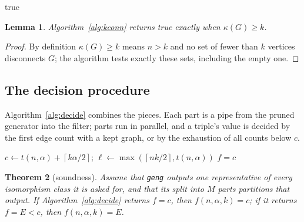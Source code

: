 \documentclass[11pt]{article}
\newtheorem{theorem}{Theorem}
\newtheorem{lemma}[theorem]{Lemma}
\theoremstyle{definition}
\theoremstyle{remark}
\newcommand{\ceil}[1]{\left\lceil #1\right\rceil}
\begin{document}
\begin{algorithm}[t]
\caption{$k$-connectivity by exhaustive deletion (\texttt{filter2.c}, function \texttt{kconnected})}\label{alg:kconn}
\Return true\;
\end{algorithm}

\begin{lemma}\label{lem:kconn}
Algorithm~\ref{alg:kconn} returns true exactly when $\kappa(G)\ge k$.
\end{lemma}

\begin{proof}
By definition $\kappa(G)\ge k$ means $n>k$ and no set of fewer than $k$ vertices disconnects $G$; the algorithm tests
exactly these sets, including the empty one.
\end{proof}

\subsection{The decision procedure}

Algorithm~\ref{alg:decide} combines the pieces. Each part is a pipe from the pruned generator into the filter; parts
run in parallel, and a triple's value is decided by the first edge count with a kept graph, or by the exhaustion of
all counts below $c$.

\begin{algorithm}[t]
\caption{Deciding $f(n,\alpha,k)$ on an open-window triple (\texttt{run\_enum.py})}\label{alg:decide}
$c\leftarrow t(n,\alpha)+\ceil{k\alpha/2}$; $\ell\leftarrow\max(\ceil{nk/2},t(n,\alpha))$\;
\Return $f=c$\;
\end{algorithm}

\begin{theorem}[soundness]\label{thm:sound}
Assume that \texttt{geng} outputs one representative of every isomorphism class it is asked for, and that its
split into $M$ parts partitions that output. If Algorithm~\ref{alg:decide} returns $f=c$, then $f(n,\alpha,k)=c$; if it returns $f=E<c$, then $f(n,\alpha,k)=E$.
\end{theorem}
\end{document}
